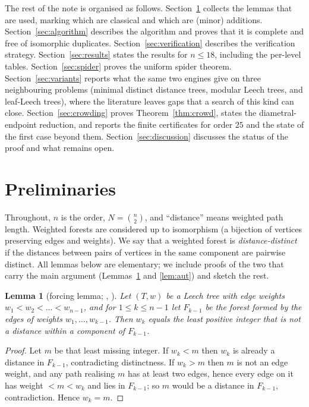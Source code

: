 \documentclass[11pt,a4paper]{article}
\theoremstyle{plain}
\newtheorem{lemma}[theorem]{Lemma}
\theoremstyle{remark}
\newcommand{\bin}[2]{\binom{#1}{#2}}
\begin{document}
The rest of the note is organised as follows.  Section~\ref{sec:prelim}
collects the lemmas that are used, marking which are classical and which are
(minor) additions.  Section~\ref{sec:algorithm} describes the algorithm and
proves that it is complete and free of isomorphic duplicates.
Section~\ref{sec:verification} describes the verification strategy.
Section~\ref{sec:results} states the results for $n\le 18$, including the
per-level tables.  Section~\ref{sec:spider} proves the uniform spider theorem.
Section~\ref{sec:variants} reports what the same two engines
give on three neighbouring problems (minimal distinct distance trees, modular
Leech trees, and leaf-Leech trees), where the literature leaves gaps that a
search of this kind can close.  Section~\ref{sec:crowding} proves
Theorem~\ref{thm:crowd}, states the diametral-endpoint reduction, and reports
the finite certificates for order $25$ and the state of the first case beyond
them.
Section~\ref{sec:discussion} discusses the status
of the proof and what remains open.

\section{Preliminaries}\label{sec:prelim}

Throughout, $n$ is the order, $N=\bin n2$, and ``distance'' means weighted path
length.  Weighted forests are considered up to isomorphism (a bijection of
vertices preserving edges and weights).  We say that a weighted forest is
\emph{distance-distinct} if the distances between pairs of vertices in the same
component are pairwise distinct.  All lemmas below are elementary; we include
proofs of the two that carry the main argument (Lemmas~\ref{lem:forcing} and
\ref{lem:aut}) and sketch the rest.

\begin{lemma}[forcing lemma; {\cite[``Find-Next-Weight'']{SzekelyWangZhang2005}},
{\cite[Lemma 2.6]{Calhoun2007}}]\label{lem:forcing}
Let $(T,w)$ be a Leech tree with edge weights $w_1<w_2<\dots<w_{n-1}$, and for
$1\le k\le n-1$ let $F_{k-1}$ be the forest formed by the edges of weights
$w_1,\dots,w_{k-1}$.  Then $w_k$ equals the least positive integer that is not a
distance within a component of $F_{k-1}$.
\end{lemma}

\begin{proof}
Let $m$ be that least missing integer.  If $w_k<m$ then $w_k$ is already a
distance in $F_{k-1}$, contradicting distinctness.  If $w_k>m$ then $m$ is not an
edge weight, and any path realising $m$ has at least two edges, hence every edge
on it has weight $<m<w_k$ and lies in $F_{k-1}$; so $m$ would be a distance in
$F_{k-1}$, contradiction.  Hence $w_k=m$.
\end{proof}
\end{document}
